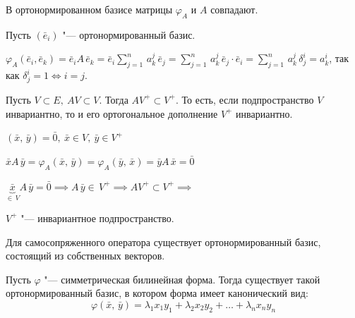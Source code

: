 \begin{theorem}
  В ортонормированном базисе матрицы $\varphi_A$ и $A$ совпадают.
\end{theorem}
\begin{Proof}
  Пусть $(\bar{e}_i)$ "--- ортонормированный базис.

  $\varphi_A(\bar{e}_i, \bar{e}_k) = \bar{e}_i A\, \bar{e}_k = \bar{e}_i \sum\limits_{j = 1}^n \, a_k^j \, \bar{e}_j = \sum\limits_{j = 1}^n \, a_k^j \, \bar{e}_j \cdot \bar{e}_i = \sum\limits_{j = 1}^n \, a_k^j \, \delta_j^i = a_k^i$, так как $\delta_j^i = 1 \Leftrightarrow i = j$.
\end{Proof}

\begin{theorem}
  Пусть $V \subset E, ~ AV \subset V$. Тогда $AV^{+} \subset V^{+}$. То есть, если подпространство $V$ инвариантно, то и его ортогональное дополнение $V^{+}$ инвариантно.
\end{theorem}
\begin{Proof}
  $(\bar{x}, \, \bar{y}) = \bar{0},~ \bar{x} \in V, ~ \bar{y} \in V^{+}$

  $\bar{x} A\, \bar{y} = \varphi_A(\bar{x}, \, \bar{y}) = \varphi_A(\bar{y},\, \bar{x}) = \bar{y} A\, \bar{x} = \bar{0}$

  $\underbrace{\bar{x}}_{\in \, V} A\, \bar{y} = \bar{0} \implies A\, \bar{y} \in \, V^{+} \implies AV^{+} \subset V^{+} \implies$
  
  $V^{+}$ "--- инвариантное подпространство. 
\end{Proof}

\begin{theorem}
  Для самосопряженного оператора существует ортонормированный базис, состоящий из собственных векторов.
\end{theorem}

\begin{theorem}
  Пусть $\varphi$ "--- симметрическая билинейная форма. Тогда существует такой ортонормированный базис, в котором форма имеет канонический вид:
  $$
    \varphi(\bar{x}, \, \bar{y}) = \lambda_1 x_1 y_1 + \lambda_2 x_2 y_2 + \ldots + \lambda_n x_n y_n
  $$
\end{theorem}